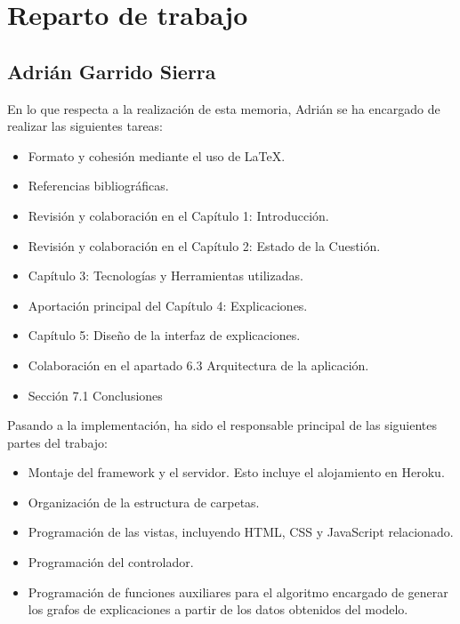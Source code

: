 \chapter{Reparto de trabajo}
\label{Appendix:Key1}

\section{Adrián Garrido Sierra}

En lo que respecta a la realización de esta memoria, Adrián se ha encargado de realizar las siguientes tareas:

\begin{itemize}
\item Formato y cohesión mediante el uso de LaTeX.

\item Referencias bibliográficas.

\item Revisión y colaboración en el Capítulo 1: Introducción.

\item Revisión y colaboración en el Capítulo 2: Estado de la Cuestión.

\item Capítulo 3: Tecnologías y Herramientas utilizadas.

\item Aportación principal del Capítulo 4: Explicaciones.

\item Capítulo 5: Diseño de la interfaz de explicaciones.

\item Colaboración en el apartado 6.3 Arquitectura de la aplicación.

\item Sección 7.1 Conclusiones\\
\end{itemize}

Pasando a la implementación, ha sido el responsable principal de las siguientes partes del trabajo:

\begin{itemize}
\item Montaje del framework y el servidor. Esto incluye el alojamiento en Heroku.

\item Organización de la estructura de carpetas.

\item Programación de las vistas, incluyendo HTML, CSS y JavaScript relacionado.

\item Programación del controlador.

\item Programación de funciones auxiliares para el algoritmo encargado de generar los grafos de explicaciones a partir de los datos obtenidos del modelo.
\end{itemize}